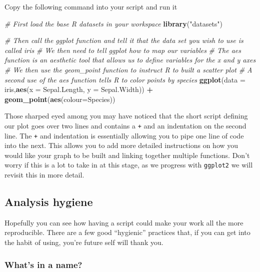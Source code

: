 \documentclass[
]{book}
\newenvironment{Shaded}{\begin{snugshade}}{\end{snugshade}}
\newcommand{\AttributeTok}[1]{\textcolor[rgb]{0.13,0.29,0.53}{#1}}
\newcommand{\CommentTok}[1]{\textcolor[rgb]{0.56,0.35,0.01}{\textit{#1}}}
\newcommand{\FunctionTok}[1]{\textcolor[rgb]{0.13,0.29,0.53}{\textbf{#1}}}
\newcommand{\NormalTok}[1]{#1}
\newcommand{\SpecialCharTok}[1]{\textcolor[rgb]{0.81,0.36,0.00}{\textbf{#1}}}
\newcommand{\StringTok}[1]{\textcolor[rgb]{0.31,0.60,0.02}{#1}}
\begin{document}
Copy the following command into your script and run it

\begin{Shaded}
\begin{Highlighting}[]
\CommentTok{\# First load the base R datasets in your workspace}
\FunctionTok{library}\NormalTok{(}\StringTok{"datasets"}\NormalTok{)}

\CommentTok{\# Then call the ggplot function and tell it that the data set you wish to use is called iris}
\CommentTok{\# We then need to tell ggplot how to map our variables}
\CommentTok{\# The aes function is an aesthetic tool that allows us to define variables for the x and y axes}
\CommentTok{\# We then use the geom\_point function to instruct R to built a scatter plot}
\CommentTok{\# A second use of the aes function tells R to color points by species}
\FunctionTok{ggplot}\NormalTok{(}\AttributeTok{data =}\NormalTok{ iris,}\FunctionTok{aes}\NormalTok{(}\AttributeTok{x =}\NormalTok{ Sepal.Length, }\AttributeTok{y =}\NormalTok{ Sepal.Width)) }\SpecialCharTok{+} 
  \FunctionTok{geom\_point}\NormalTok{(}\FunctionTok{aes}\NormalTok{(}\AttributeTok{colour=}\NormalTok{Species)) }
\end{Highlighting}
\end{Shaded}

Those sharped eyed among you may have noticed that the short script defining our plot goes over two lines and contains a \texttt{+} and an indentation on the second line. The \texttt{+} and indentation is essentially allowing you to pipe one line of code into the next. This allows you to add more detailed instructions on how you would like your graph to be built and linking together multiple functions. Don't worry if this is a lot to take in at this stage, as we progress with \texttt{ggplot2} we will revisit this in more detail.

\subsection{Analysis hygiene}\label{analysis-hygiene}

Hopefully you can see how having a script could make your work all the more reproducible. There are a few good ``hygienic'' practices that, if you can get into the habit of using, you're future self will thank you.

\subsubsection{What's in a name?}\label{whats-in-a-name}
\end{document}
